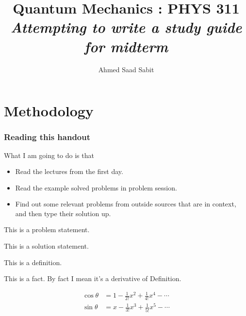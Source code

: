 \documentclass[10pt]{article}
\begin{document}
	\title{{Quantum Mechanics : PHYS 311}\\{\normalsize{\itshape 
Attempting to write a study guide for midterm
	}}}
	\author{Ahmed Saad Sabit}
	\maketitle
	\newpage
	\pagestyle{fancynotes}

\part{Methodology}
\section{Reading this handout} 
What I am going to do is that
\begin{itemize}
	\item Read the lectures from the first day. 
	\item Read the example solved problems in problem session. 
	\item Find out some relevant problems from outside sources that are in context, and then type their solution up. 
\end{itemize}
\begin{prob}
	This is a problem statement.
\end{prob}
\begin{solu}
	This is a solution statement. 
\end{solu}
\begin{definition}
	This is a definition. 
\end{definition}
\begin{fact}
This is a fact. By fact I mean it's a derivative of Definition.
\end{fact}



\begin{align*}
	\cos \theta &= 1 - \frac{1}{2!} x^2 + \frac{1}{4!} x^{4} - \cdots  \\ 
	\sin \theta &= x - \frac{1}{3!} x^3 + \frac{1}{5!} x^{5} - \cdots \\
\end{align*}
\end{document}

